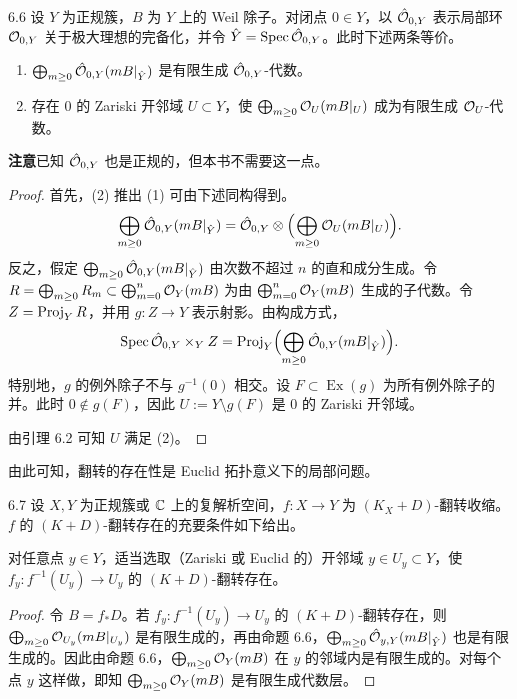 \begin{proposition*}{6.6}
设 $Y$ 为正规簇，$B$ 为 $Y$ 上的 Weil 除子。对闭点 $0\in Y$，以 $\hat{\mathcal{O}}_{0,Y}$ 表示局部环 $\mathcal{O}_{0,Y}$ 关于极大理想的完备化，并令 $\hat Y=\operatorname{Spec}\hat{\mathcal{O}}_{0,Y}$。此时下述两条等价。

\begin{enumerate}[label=（\arabic*）,leftmargin=2.8em]
\item $\bigoplus_{m\ge0}\hat{\mathcal{O}}_{0,Y}(mB|_{\hat Y})$ 是有限生成 $\hat{\mathcal{O}}_{0,Y}$-代数。
\item 存在 $0$ 的 Zariski 开邻域 $U\subset Y$，使 $\bigoplus_{m\ge0}\mathcal{O}_U(mB|_U)$ 成为有限生成 $\mathcal{O}_U$-代数。
\end{enumerate}
\end{proposition*}

\par\medskip\noindent\textbf{注意}\quad 已知 $\hat{\mathcal{O}}_{0,Y}$ 也是正规的，但本书不需要这一点。

\begin{proof}
首先，(2) 推出 (1) 可由下述同构得到。
\[
\bigoplus_{m\ge0}\hat{\mathcal{O}}_{0,Y}(mB|_{\hat Y})=\hat{\mathcal{O}}_{0,Y}\otimes\Bigl(\bigoplus_{m\ge0}\mathcal{O}_U(mB|_U)\Bigr).
\]
反之，假定 $\bigoplus_{m\ge0}\hat{\mathcal{O}}_{0,Y}(mB|_{\hat Y})$ 由次数不超过 $n$ 的直和成分生成。令 $R=\bigoplus_{m\ge0}R_m\subset\bigoplus_{m=0}^n\mathcal{O}_Y(mB)$ 为由 $\bigoplus_{m=0}^n\mathcal{O}_Y(mB)$ 生成的子代数。令 $Z=\operatorname{Proj}_Y R$，并用 $g:Z\to Y$ 表示射影。由构成方式，
\[
\operatorname{Spec}\hat{\mathcal{O}}_{0,Y}\times_Y Z=\operatorname{Proj}_Y\Bigl(\bigoplus_{m\ge0}\hat{\mathcal{O}}_{0,Y}(mB|_{\hat Y})\Bigr).
\]
特别地，$g$ 的例外除子不与 $g^{-1}(0)$ 相交。设 $F\subset\operatorname{Ex}(g)$ 为所有例外除子的并。此时 $0\notin g(F)$，因此 $U:=Y\setminus g(F)$ 是 $0$ 的 Zariski 开邻域。

由引理 6.2 可知 $U$ 满足 (2)。
\end{proof}

由此可知，翻转的存在性是 Euclid 拓扑意义下的局部问题。

\begin{corollaryp}{6.7}
设 $X,Y$ 为正规簇或 $\mathbb{C}$ 上的复解析空间，$f:X\to Y$ 为 $(K_X+D)$-翻转收缩。$f$ 的 $(K+D)$-翻转存在的充要条件如下给出。

对任意点 $y\in Y$，适当选取（Zariski 或 Euclid 的）开邻域 $y\in U_y\subset Y$，使 $f_y:f^{-1}(U_y)\to U_y$ 的 $(K+D)$-翻转存在。
\end{corollaryp}

\begin{proof}
令 $B=f_*D$。若 $f_y:f^{-1}(U_y)\to U_y$ 的 $(K+D)$-翻转存在，则 $\bigoplus_{m\ge0}\mathcal{O}_{U_y}(mB|_{U_y})$ 是有限生成的，再由命题 6.6，$\bigoplus_{m\ge0}\hat{\mathcal{O}}_{y,Y}(mB|_{\hat Y})$ 也是有限生成的。因此由命题 6.6，$\bigoplus_{m\ge0}\mathcal{O}_Y(mB)$ 在 $y$ 的邻域内是有限生成的。对每个点 $y$ 这样做，即知 $\bigoplus_{m\ge0}\mathcal{O}_Y(mB)$ 是有限生成代数层。
\end{proof}

